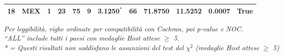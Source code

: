 \begin{table}[H]
\begin{tabularx}{\textwidth}{@{} l *{11}{C} @{}}
18          &        MEX   &             1 &            23 &           75 &             9 &           3.1250$^*$ &            66 &              71.8750 &           11.5252 &           0.0007 &        True\\
\bottomrule
\end{tabularx}
\vspace{2pt}
\raggedright
\small
\textit{Per leggibilità, righe ordinate per compatibilità con Cochran, poi p-value e NOC.}\\
\textit{``ALL'' include tutti i paesi con medaglie Host attese $\ge$ 5.}\\
\textit{* = Questi risultati non soddisfano le assunzioni del test del $\chi^2$ (medaglie Host attese $\ge$ 5)}
\end{table}




